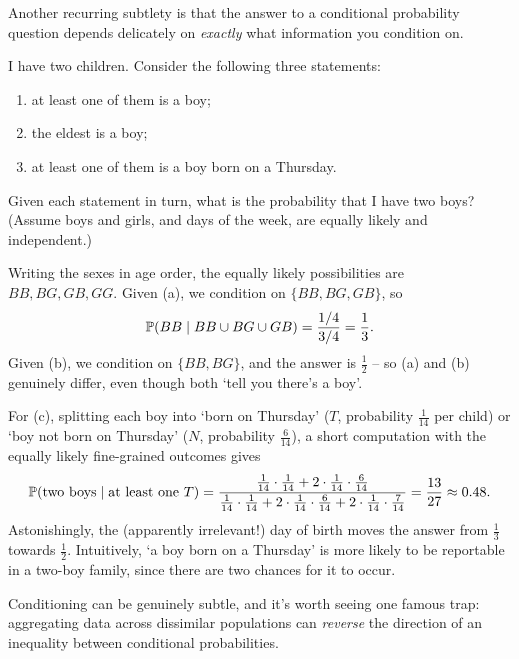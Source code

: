 \documentclass[a4paper]{scrartcl}
\begin{document}
Another recurring subtlety is that the answer to a conditional probability question depends delicately on \emph{exactly} what information you condition on.

\begin{example}
	I have two children. Consider the following three statements:
	\begin{enumerate}[label=(\alph*)]
		\item at least one of them is a boy;
		\item the eldest is a boy;
		\item at least one of them is a boy born on a Thursday.
	\end{enumerate}
	Given each statement in turn, what is the probability that I have two boys? (Assume boys and girls, and days of the week, are equally likely and independent.)

	Writing the sexes in age order, the equally likely possibilities are $BB, BG, GB, GG$. Given (a), we condition on $\{BB, BG, GB\}$, so
	$$
	\mathbb{P}(BB \mid BB \cup BG \cup GB) = \frac{1/4}{3/4} = \frac13.
	$$
	Given (b), we condition on $\{BB, BG\}$, and the answer is $\frac12$ -- so (a) and (b) genuinely differ, even though both `tell you there's a boy'.

	For (c), splitting each boy into `born on Thursday' ($T$, probability $\frac{1}{14}$ per child) or `boy not born on Thursday' ($N$, probability $\frac{6}{14}$), a short computation with the equally likely fine-grained outcomes gives
	$$
	\mathbb{P}(\text{two boys} \mid \text{at least one } T) = \frac{\frac{1}{14}\cdot\frac{1}{14} + 2\cdot\frac{1}{14}\cdot\frac{6}{14}}{\frac{1}{14}\cdot\frac{1}{14} + 2\cdot\frac{1}{14}\cdot\frac{6}{14} + 2 \cdot \frac{1}{14}\cdot\frac{7}{14}} = \frac{13}{27} \approx 0.48.
	$$
	Astonishingly, the (apparently irrelevant!) day of birth moves the answer from $\frac13$ towards $\frac12$. Intuitively, `a boy born on a Thursday' is more likely to be reportable in a two-boy family, since there are two chances for it to occur.
\end{example}

Conditioning can be genuinely subtle, and it's worth seeing one famous trap: aggregating data across dissimilar populations can \emph{reverse} the direction of an inequality between conditional probabilities.
\end{document}
